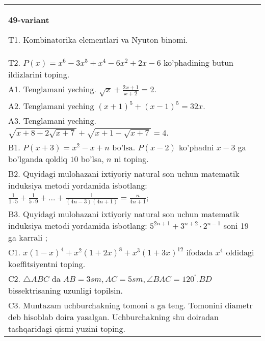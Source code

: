 \documentclass{article}
\begin{document}
\begin{tabular}{m{17cm}}
\textbf{49-variant}
\newline

T1. Kombinatorika elementlari va Nyuton binomi. \\
T2. \(P(x) = x^{6} - 3x^{5} + x^{4} - 6x^{2} + 2x - 6\) ko'phadining butun ildizlarini toping. \\
A1. Tenglamani yeching. \(\sqrt{x} + \frac{2x + 1}{x + 2} = 2\). \\
A2. Tenglamani yeching \((x + 1)^{5} + (x - 1)^{5} = 32x\). \\
A3. Tenglamani yeching. \(\sqrt{x + 8 + 2\sqrt{x + 7}} + \sqrt{x + 1 - \sqrt{x + 7}} = 4\). \\
B1. \(P(x + 3) = x^{2} - x + n\) bo'lsa. \(P(x - 2)\) ko'phadni \(x - 3\) ga bo'lganda qoldiq \(10\) bo'lsa, \(n\) ni toping. \\
B2. Quyidagi mulohazani ixtiyoriy natural son uchun matematik induksiya metodi yordamida isbotlang: \(\frac{1}{1 \cdot 5} + \frac{1}{5 \cdot 9} + ... + \frac{1}{(4n - 3)(4n + 1)} = \frac{n}{4n + 1}\); \\
B3. Quyidagi mulohazani ixtiyoriy natural son uchun matematik induksiya metodi yordamida isbotlang: \(5^{2n + 1} + 3^{n + 2} \cdot 2^{n - 1}\) soni 19 ga karrali ; \\
C1. \(x(1 - x)^{4} + x^{2}(1 + 2x)^{8} + x^{3}(1 + 3x)^{12}\) ifodada \(x^{4}\) oldidagi koeffitsiyentni toping. \\
C2. \(\bigtriangleup ABC\) da \(AB = 3sm,AC = 5sm,\angle BAC = 120^{{^\circ}}.BD\) bissektrisaning uzunligi topilsin. \\
C3. Muntazam uchburchakning tomoni a ga teng. Tomonini diametr deb hisoblab doira yasalgan. Uchburchakning shu doiradan tashqaridagi qismi yuzini toping. \\

\end{tabular}
\vspace{1cm}
\end{document}
